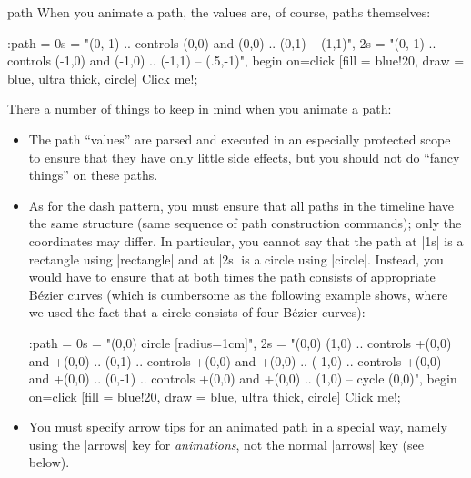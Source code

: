\begin{tikzanimateattribute}{path}
  When you animate a path, the values are, of course, paths themselves:
\begin{codeexample}[animation list={0.5,1,1.5,2}]
\tikz \node :path = {
        0s = "{(0,-1) .. controls (0,0) and (0,0)   .. (0,1) -- (1,1)}",
        2s = "{(0,-1) .. controls (-1,0) and (-1,0) .. (-1,1) -- (.5,-1)}",
        begin on=click }
  [fill = blue!20, draw = blue, ultra thick, circle] {Click me!}; 
\end{codeexample}
  There a number of things to keep in mind when you animate a path:
  \begin{itemize}
  \item The path ``values'' are parsed and executed in an especially
    protected scope to ensure that they have only little side effects,
    but you should not do ``fancy things'' on these paths.
  \item 
    As for the dash pattern, you must ensure that all paths in the
    timeline have the same structure (same sequence of path construction
    commands); only the coordinates may differ. In particular, you
    cannot say that the path at |1s| is a rectangle using
    |rectangle| and at |2s| is a circle using
    |circle|. Instead, you would have to ensure that at both
    times the path consists of appropriate Bézier curves (which is
    cumbersome as the following example shows, where we used the fact
    that a circle consists of four Bézier curves):
\begin{codeexample}[animation list={0.5,1,1.5,2}]
\tikz \node :path = {
        0s = "{(0,0) circle [radius=1cm]}",
        2s = "{(0,0)
               (1,0) .. controls +(0,0) and +(0,0) .. (0,1)
                     .. controls +(0,0) and +(0,0) .. (-1,0)
                     .. controls +(0,0) and +(0,0) .. (0,-1)
                     .. controls +(0,0) and +(0,0) .. (1,0)
                     -- cycle (0,0)}",
        begin on=click}
  [fill = blue!20, draw = blue, ultra thick, circle] {Click me!}; 
\end{codeexample}
  \item
    You must specify arrow tips for an animated path in a special way,
    namely using the |arrows| key for \emph{animations}, not the
    normal |arrows| key (see below). 
  \end{itemize}
\end{tikzanimateattribute}


